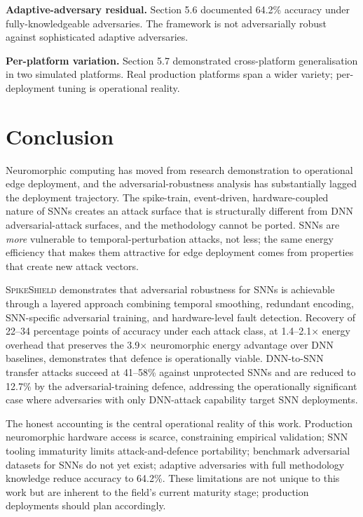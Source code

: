 \documentclass[sigconf,nonacm]{acmart}
\begin{document}
\textbf{Adaptive-adversary residual.} Section 5.6 documented
64.2\% accuracy under fully-knowledgeable adversaries. The
framework is not adversarially robust against sophisticated
adaptive adversaries.

\textbf{Per-platform variation.} Section 5.7 demonstrated
cross-platform generalisation in two simulated platforms. Real
production platforms span a wider variety; per-deployment tuning
is operational reality.

\section{Conclusion}

Neuromorphic computing has moved from research demonstration to
operational edge deployment, and the adversarial-robustness
analysis has substantially lagged the deployment trajectory. The
spike-train, event-driven, hardware-coupled nature of SNNs
creates an attack surface that is structurally different from
DNN adversarial-attack surfaces, and the methodology cannot be
ported. SNNs are \emph{more} vulnerable to temporal-perturbation
attacks, not less; the same energy efficiency that makes them
attractive for edge deployment comes from properties that create
new attack vectors.

\textsc{SpikeShield} demonstrates that adversarial robustness for
SNNs is achievable through a layered approach combining
temporal smoothing, redundant encoding, SNN-specific adversarial
training, and hardware-level fault detection. Recovery of 22--34
percentage points of accuracy under each attack class, at
1.4--2.1$\times$ energy overhead that preserves the
3.9$\times$ neuromorphic energy advantage over DNN baselines,
demonstrates that defence is operationally viable. DNN-to-SNN
transfer attacks succeed at 41--58\% against unprotected SNNs and
are reduced to 12.7\% by the adversarial-training defence,
addressing the operationally significant case where adversaries
with only DNN-attack capability target SNN deployments.

The honest accounting is the central operational reality of this
work. Production neuromorphic hardware access is scarce,
constraining empirical validation; SNN tooling immaturity limits
attack-and-defence portability; benchmark adversarial datasets
for SNNs do not yet exist; adaptive adversaries with full
methodology knowledge reduce accuracy to 64.2\%. These
limitations are not unique to this work but are inherent to the
field's current maturity stage; production deployments should
plan accordingly.
\end{document}
